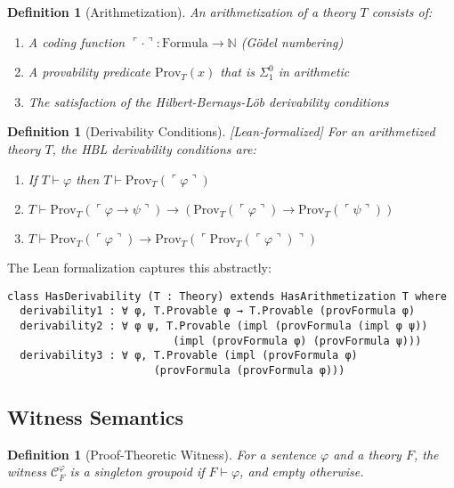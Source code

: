 \documentclass[11pt]{article}
\newtheorem{definition}[theorem]{Definition}
\newcommand{\Prov}{\mathrm{Prov}}
\newcommand{\N}{\mathbb{N}}
\newcommand{\leanok}{\textsf{\textcolor{green!70!black}{[Lean-formalized]}}}
\begin{document}
\begin{definition}[Arithmetization]
An \emph{arithmetization} of a theory $T$ consists of:
\begin{enumerate}
\item A coding function $\ulcorner \cdot \urcorner: \text{Formula} \to \N$ (Gödel numbering)
\item A provability predicate $\Prov_T(x)$ that is $\Sigma^0_1$ in arithmetic
\item The satisfaction of the Hilbert-Bernays-Löb derivability conditions
\end{enumerate}
\end{definition}

\begin{definition}[Derivability Conditions] \leanok
For an arithmetized theory $T$, the \emph{HBL derivability conditions} are:
\begin{enumerate}
\item[(D1)] If $T \vdash \varphi$ then $T \vdash \Prov_T(\ulcorner\varphi\urcorner)$
\item[(D2)] $T \vdash \Prov_T(\ulcorner\varphi \to \psi\urcorner) \to (\Prov_T(\ulcorner\varphi\urcorner) \to \Prov_T(\ulcorner\psi\urcorner))$
\item[(D3)] $T \vdash \Prov_T(\ulcorner\varphi\urcorner) \to \Prov_T(\ulcorner\Prov_T(\ulcorner\varphi\urcorner)\urcorner)$
\end{enumerate}
\end{definition}

The Lean formalization captures this abstractly:
\begin{lstlisting}[language=Lean]
class HasDerivability (T : Theory) extends HasArithmetization T where
  derivability1 : ∀ φ, T.Provable φ → T.Provable (provFormula φ)
  derivability2 : ∀ φ ψ, T.Provable (impl (provFormula (impl φ ψ))
                          (impl (provFormula φ) (provFormula ψ)))
  derivability3 : ∀ φ, T.Provable (impl (provFormula φ) 
                       (provFormula (provFormula φ)))
\end{lstlisting}

\subsection{Witness Semantics}

\begin{definition}[Proof-Theoretic Witness]
For a sentence $\varphi$ and a theory $F$, the witness $\mathcal C^\varphi_F$ is a singleton groupoid if $F\vdash \varphi$, and empty otherwise.
\end{definition}
\end{document}
